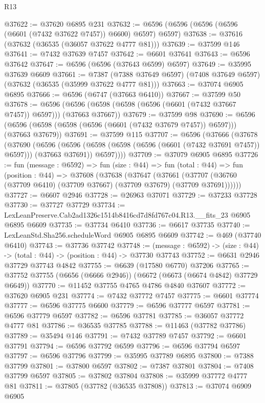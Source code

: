 \begin{lexlean}{R13}
\begin{coremodule}
@37622 := @37620 @6895 @231
@37632 := @6596 (@6596 (@6596 (@6596 (@6601 (@7432 @37622 @7457)) @6600) @6597) @6597)
@37638 := @37616 (@37632 (@36535 (@36057 @37622 @4777 @81)))
@37639 := @37599 @146
@37641 := @7432 @37639 @7457
@37642 := @6601 @37641
@37643 := @6596 @37642
@37647 := @6596 (@6596 (@37643 @6599) @6597)
@37649 := @35995 @37639 @6609
@37661 := @7387
    (@7388 @37649 @6597)
    (@7408 @37649 @6597)
    (@37632 (@36535 (@35999 @37622 @4777 @81)))
@37663 := @37074 @6905 @6895
@37666 := @6596 (@6747 (@37663 @6410))
@37667 := @37599 @50
@37678 := @6596 (@6596 (@6598 (@6598 (@6596 (@6601 (@7432 @37667 @7457)) @6597))) (@37663 @37667))
@37679 := @37599 @98
@37690 := @6596 (@6596 (@6598 (@6598 (@6596 (@6601 (@7432 @37679 @7457)) @6597))) (@37663 @37679))
@37691 := @37599 @115
@37707 := @6596
    (@37666
      (@37678
        (@37690
          (@6596
            (@6596 (@6598 (@6598 (@6596 (@6601 (@7432 @37691 @7457)) @6597))) (@37663 @37691))
            @6597))))
@37709 := @37079 @6905 @6895
@37726 := fun (message : @6592) =>
  fun (size : @44) =>
  fun (total : @44) =>
  fun (position : @44) =>
  @37608
    (@37638
      (@37647
        (@37661 (@37707 (@36760 (@37709 @6410) (@37709 @37667) (@37709 @37679) (@37709 @37691))))))
@37727 := @6607 @2946
@37728 := @26963 @37071
@37729 := @37233 @37728
@37730 := @37727 @37729
@37734 := LexLeanPreserve.Cab2ad1326c1514b8416cd7d8fd767c04.R13.__fits_23 @6905 @6895 @6609
@37735 := @37734 @6410
@37736 := @6617 @37735
@37740 := LexLeanStd.Sha256.scheduleWord @6905 @6895 @6609
@37742 := @469 (@37740 @6410)
@37743 := @37736 @37742
@37748 := (message : @6592) -> (size : @44) -> (total : @44) -> (position : @44) -> @37730 @37743
@37752 := @6631 @2946 @37729 @37743 @4842
@37755 := @6639 (@17580 @6770) @37206
@37765 := @37752 @37755 (@6656 (@6666 @2946)) (@6672 (@6673 (@6674 @4842) @37729 @6649))
@37770 := @11452 @37755 @4765 @4786 @4840 @37607
@37772 := @37620 @6905 @231
@37774 := @7432 @37772 @7457
@37775 := @6601 @37774
@37777 := @6596 @37775 @6600
@37779 := @6596 @37777 @6597
@37781 := @6596 @37779 @6597
@37782 := @6596 @37781
@37785 := @36057 @37772 @4777 @81
@37786 := @36535 @37785
@37788 := @11463 (@37782 @37786)
@37789 := @35494 @146
@37791 := @7432 @37789 @7457
@37792 := @6601 @37791
@37794 := @6596 @37792 @6599
@37796 := @6596 @37794 @6597
@37797 := @6596 @37796
@37799 := @35995 @37789 @6895
@37800 := @7388 @37799
@37801 := @37800 @6597
@37802 := @7387 @37801
@37804 := @7408 @37799 @6597
@37805 := @37802 @37804
@37808 := @35999 @37772 @4777 @81
@37811 := @37805 (@37782 (@36535 @37808))
@37813 := @37074 @6909 @6905

\end{coremodule}
\end{lexlean}
